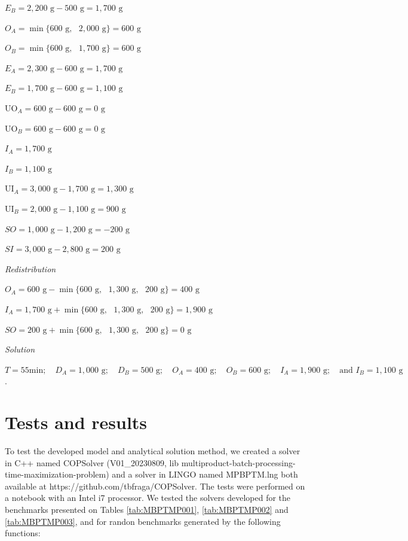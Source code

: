 \documentclass[authoryear,manuscript,12pt]{elsarticle}
\begin{document}
$E_B = 2,200 \textrm{ g} - 500 \textrm{ g} = 1,700 \textrm{ g}$

$O_A = \min \{600 \textrm{ g}, \textrm{ }  2,000 \textrm{ g}\} = 600 \textrm{ g}$

$O_B = \min \{600 \textrm{ g}, \textrm{ }  1,700 \textrm{ g}\} = 600 \textrm{ g}$

$E_A = 2,300 \textrm{ g} - 600 \textrm{ g} = 1,700 \textrm{ g}$

$E_B = 1,700 \textrm{ g} - 600 \textrm{ g} = 1,100 \textrm{ g}$

$\textrm{UO}_A = 600 \textrm{ g} - 600 \textrm{ g} = 0 \textrm{ g}$

$\textrm{UO}_B = 600 \textrm{ g} - 600 \textrm{ g} = 0 \textrm{ g}$

$I_A = 1,700 \textrm{ g}$

$I_B = 1,100 \textrm{ g}$

$\textrm{UI}_A = 3,000 \textrm{ g} - 1,700 \textrm{ g} = 1,300 \textrm{ g}$

$\textrm{UI}_B = 2,000 \textrm{ g} - 1,100 \textrm{ g} = 900 \textrm{ g}$

$SO = 1,000 \textrm{ g} - 1,200 \textrm{ g} = - 200 \textrm{ g}$

$SI = 3,000 \textrm{ g} - 2,800 \textrm{ g} = 200 \textrm{ g}$

\emph{Redistribution}

$O_A = 600 \textrm{ g} - \min \{600 \textrm{ g}, \textrm{ }  1,300 \textrm{ g}, \textrm{ }  200 \textrm{ g}\} = 400 \textrm{ g}$

$I_A = 1,700 \textrm{ g} + \min \{600 \textrm{ g}, \textrm{ }  1,300 \textrm{ g}, \textrm{ }  200 \textrm{ g}\} = 1,900 \textrm{ g}$

$SO = 200 \textrm{ g} + \min \{600 \textrm{ g}, \textrm{ }  1,300 \textrm{ g}, \textrm{ }  200 \textrm{ g}\} = 0 \textrm{ g}$

\emph{Solution}

$T = 55 \textrm{min}; \quad D_A = 1,000 \textrm{ g}; \quad D_B = 500 \textrm{ g}; \quad O_A = 400 \textrm{ g}; \quad O_B = 600 \textrm{ g}; \quad I_A = 1,900 \textrm{ g}; \quad \textrm{and } I_B = 1,100 \textrm{ g}$.

\section{Tests and results}
\label{sec:results}

To test the developed model and analytical solution method, we created a solver in C++ named COPSolver (V01\_20230809, lib multiproduct-batch-processing-time-maximization-problem) and a solver in LINGO named MPBPTM.lng both available at https://github.com/tbfraga/COPSolver. The tests were performed on a notebook with an Intel i7 processor. We tested the solvers developed for the benchmarks presented on Tables \ref{tab:MBPTMP001}, \ref{tab:MBPTMP002} and \ref{tab:MBPTMP003}, and for randon benchmarks generated by the following functions: \\
\end{document}
